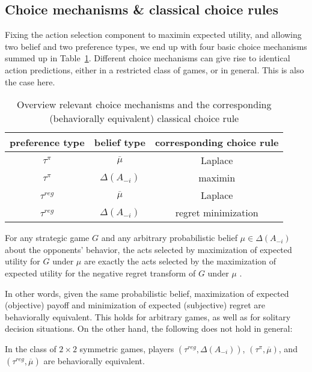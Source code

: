\documentclass[fleqn,reqno,11pt]{article}
\begin{document}
\subsection{Choice mechanisms \& classical choice rules}

Fixing the action selection component to maximin expected utility, and allowing two belief and
two preference types, we end up with four basic choice mechanisms summed up in
Table~\ref{tab:CMs}. Different choice mechanisms can give rise to identical action predictions,
either in a restricted class of games, or in general. This is also the case here.

\begin{table}[t]
  \centering
  \begin{tabular}{ccc}
    preference type & belief type & corresponding choice rule \\ \midrule
    $\tau^\pi$ & $\overline{\mu}$ & Laplace \\
    $\tau^\pi$ & $\Delta(A_{-i})$ & maximin \\ 
    $\tau^{reg}$ & $\overline{\mu}$ & Laplace \\
    $\tau^{reg}$ & $\Delta(A_{-i})$ & regret minimization \\ 
  \end{tabular}
  \caption{Overview relevant choice mechanisms and the corresponding (behaviorally equivalent) classical choice rule}
  \label{tab:CMs}
\end{table}


\begin{fact} \label{fact:maxEU-minReg} For any strategic game $G$ and any arbitrary
  probabilistic belief $\mu \in \Delta(A_{-i})$ about the opponents' behavior, the acts
  selected by maximization of expected utility for $G$ under $\mu$ are exactly the acts
  selected by the maximization of expected utility for the negative regret transform of $G$
  under $\mu$ \citep[e.g.][]{HalpernPass2012:Iterated-Regret}.
\end{fact}

\noindent In other words, given the same probabilistic belief, maximization of expected
(objective) payoff and minimization of expected (subjective) regret are behaviorally
equivalent. This holds for arbitrary games, as well as for solitary decision situations. On the
other hand, the following does not hold in general:

\begin{fact} \label{fact:equivalence2x2}
In the class of $2 \times 2$ symmetric games, players $(\tau^{reg}, \Delta(A_{-i}))$, $(\tau^{\pi}, \overline{\mu})$, and $(\tau^{reg},\overline{\mu})$ are behaviorally equivalent.
\end{fact} 
\end{document}
